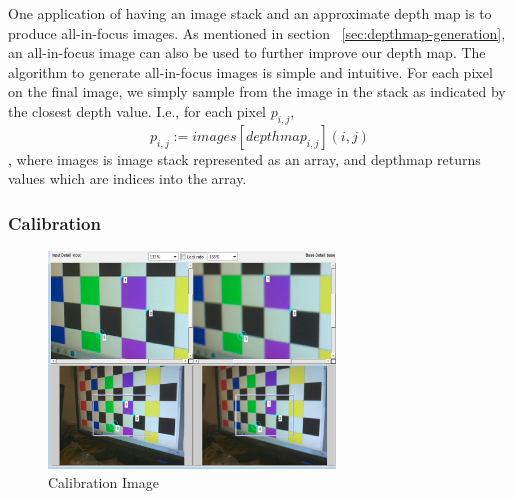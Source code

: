 \documentclass[annual]{acmsiggraph}
\begin{document}
One application of having an image stack and an approximate depth map is to produce all-in-focus images.  As mentioned in section ~\ref{sec:depthmap-generation}, an all-in-focus image can also be used to further improve our depth map.  The algorithm to generate all-in-focus images is simple and intuitive.  For each pixel on the final image, we simply sample from the image in the stack as indicated by the closest depth value. I.e., for each pixel $p_{i,j}$, 
\begin{equation} 
p_{i,j} := images[ depthmap_{i,j} ](i,j)
\end{equation}, where images is image stack represented as an array, and depthmap returns values which are indices into the array.  
\subsubsection{Calibration}

\begin{figure}
\centering
\includegraphics[width=3in]{images/calibration.jpg}
\caption{Calibration Image}
\label{fig:calibration}
\end{figure}
\end{document}
